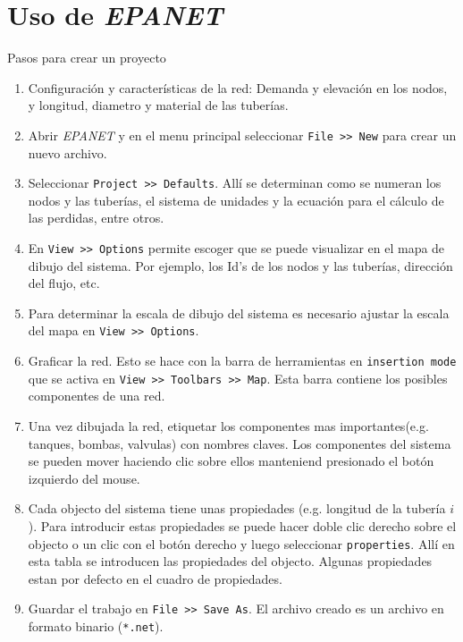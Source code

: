 \documentclass [xcolor=svgnames, t] {beamer}
\begin{document}
\section{Uso de \emph{EPANET}}
\begin{frame}{Pasos para crear un proyecto}
\scriptsize
\begin{enumerate}
\item Configuraci\'on y caracter\'isticas de la red: Demanda y elevaci\'on en los nodos, y longitud, diametro y material de las tuber\'ias.
\item Abrir \emph{EPANET} y en el menu principal seleccionar \texttt{File >> New} para crear un nuevo archivo.
\item Seleccionar  \texttt{Project >> Defaults}. All\'i se determinan como se numeran los nodos y las tuber\'ias, el sistema de unidades y la ecuaci\'on para el c\'alculo de las perdidas, entre otros.
\item En \texttt{View >> Options} permite escoger que se puede visualizar en el mapa de dibujo del sistema. Por ejemplo, los Id's de los nodos y las tuber\'ias, direcci\'on del flujo, etc.
\item Para determinar la escala de dibujo del sistema es necesario ajustar la escala del mapa en \texttt{View >> Options}. 
\item Graficar la red. Esto se hace con la barra de herramientas en \texttt{insertion mode} que se activa en \texttt{View >> Toolbars >> Map}. Esta barra contiene los posibles componentes de una red.
\item Una vez dibujada la red, etiquetar los componentes mas importantes(e.g. tanques, bombas, valvulas) con nombres claves. Los componentes del sistema se pueden mover haciendo clic sobre ellos manteniend presionado el bot\'on izquierdo del mouse.
\item Cada objecto del sistema tiene unas propiedades (e.g. longitud de la tuber\'ia $i$). Para introducir estas propiedades se puede hacer doble clic derecho sobre el objecto o un clic con el bot\'on derecho y luego seleccionar \texttt{properties}. All\'i en esta tabla se introducen las propiedades del objecto. Algunas propiedades estan por defecto en el cuadro de propiedades.
\item Guardar el trabajo en \texttt{File >> Save As}. El archivo creado es un archivo en formato binario (\texttt{*.net}). 
\end{enumerate}
\end{frame}

\end{document}
